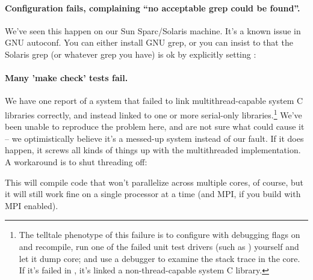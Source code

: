 \paragraph{Configuration fails, complaining ``no acceptable grep could
  be found''.} We've seen this happen on our Sun Sparc/Solaris
machine. It's a known issue in GNU autoconf. You can either install
GNU grep, or you can insist to  that the Solaris
grep (or whatever grep you have) is ok by explicitly setting
:


\paragraph{Many 'make check' tests fail.} We have one report of a
system that failed to link multithread-capable system C libraries
correctly, and instead linked to one or more serial-only
libraries.\footnote{The telltale phenotype of this failure is to
  configure with debugging flags on and recompile, run one of the
  failed unit test drivers (such as )
  yourself and let it dump core; and use a debugger to examine the
  stack trace in the core. If it's failed in
  , it's linked a non-thread-capable
  system C library.} We've been unable to reproduce the problem here,
and are not sure what could cause it -- we optimistically believe it's
a messed-up system instead of our fault. If it does happen, it screws
all kinds of things up with the multithreaded implementation. A
workaround is to shut threading off:


This will compile code that won't parallelize across multiple cores,
of course, but it will still work fine on a single processor at a time
(and MPI, if you build with MPI enabled).

